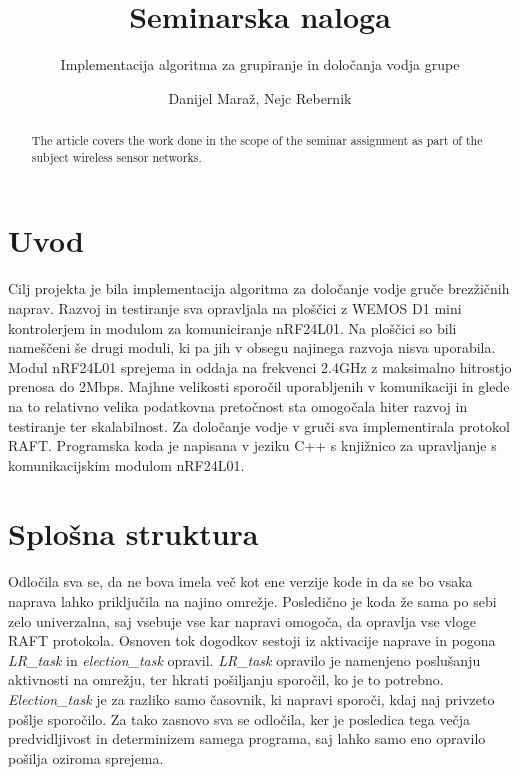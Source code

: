 \documentclass[runningheads]{llncs}
\begin{document}
\title{Seminarska naloga}
\subtitle{Implementacija algoritma za grupiranje in določanja vodja grupe}

\author{Danijel Maraž, Nejc Rebernik}


\maketitle             

\begin{abstract}
The article covers the work done in the scope of the seminar assignment as part of the subject wireless sensor networks.

\end{abstract}

\section{Uvod}
Cilj projekta je bila implementacija algoritma za določanje vodje gruče brezžičnih naprav. Razvoj in testiranje sva opravljala na ploščici z WEMOS D1 mini kontrolerjem in modulom za komuniciranje nRF24L01. Na ploščici so bili nameščeni še drugi moduli, ki pa jih v obsegu najinega razvoja nisva uporabila. Modul nRF24L01 sprejema in oddaja na frekvenci 2.4GHz z maksimalno hitrostjo prenosa do 2Mbps. Majhne velikosti sporočil uporabljenih v komunikaciji in glede na to relativno velika podatkovna pretočnost sta omogočala hiter razvoj in testiranje ter skalabilnost. Za določanje vodje v gruči sva implementirala protokol RAFT. Programska koda je napisana v jeziku C++ s knjižnico za upravljanje s komunikacijskim modulom nRF24L01.

\section{Splošna struktura}
Odločila sva se, da ne bova imela več kot ene verzije kode in da se bo vsaka naprava lahko priključila na najino omrežje. Posledično je koda že sama po sebi zelo univerzalna, saj vsebuje vse kar napravi omogoča, da opravlja vse vloge RAFT protokola. Osnoven tok dogodkov sestoji iz aktivacije naprave in pogona \textit{LR\_task} in \textit{election\_task} opravil. \textit{LR\_task} opravilo je namenjeno poslušanju aktivnosti na omrežju, ter hkrati pošiljanju sporočil, ko je to potrebno. \textit{Election\_task} je za razliko samo časovnik, ki napravi sporoči, kdaj naj privzeto pošlje sporočilo. Za tako zasnovo sva se odločila, ker je posledica tega večja predvidljivost in determinizem samega programa, saj lahko samo eno opravilo pošilja oziroma sprejema.
\end{document}
